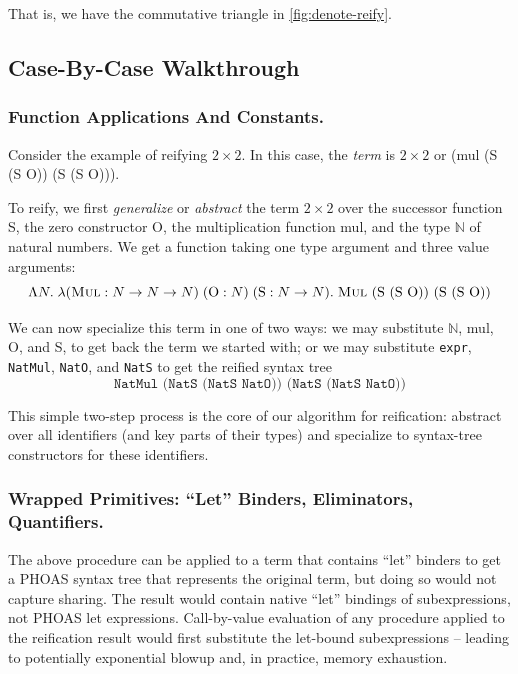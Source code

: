 That is, we have the commutative triangle in \autoref{fig:denote-reify}.

\subsection{Case-By-Case Walkthrough} \label{sec:case-by-case-walkthrough}
\subsubsection{Function Applications And Constants.} \label{sec:reification-by-parametricity-diagram}\label{sec:walkthrough-func-const}
Consider the example of reifying $2\times 2$.
In this case, the \emph{term} is $2 \times 2$ or (mul (S (S O)) (S (S O))).

To reify, we first \emph{generalize} or \emph{abstract} the term $2\times 2$ over the successor function S, the zero constructor O, the multiplication function mul, and the type $\mathbb N$ of natural numbers.
We get a function taking one type argument and three value arguments:
$$\Lambda N. \; \lambda (\textsc{Mul} : N \to N \to N) \; (\text{O} : N) \; (\text{S} : N \to N). \; \text{\textsc{Mul} (S (S O)) (S (S O))}$$

We can now specialize this term in one of two ways: we may substitute $\mathbb N$, mul, O, and S, to get back the term we started with; or we may substitute \texttt{expr}, \texttt{NatMul}, \texttt{NatO}, and \texttt{NatS} to get the reified syntax tree
\[
\texttt{NatMul (NatS (NatS NatO)) (NatS (NatS NatO))}
\]

This simple two-step process is the core of our algorithm for reification:
abstract over all identifiers (and key parts of their types) and specialize to syntax-tree constructors for these identifiers.

\subsubsection{Wrapped Primitives: ``Let'' Binders, Eliminators, Quantifiers.}\label{sec:walkthrough-wrapped}

The above procedure can be applied to a term that contains ``let'' binders to get a
PHOAS syntax tree that represents the original term, but doing so would not capture
sharing. The result would contain native ``let'' bindings of subexpressions, not
PHOAS let expressions. Call-by-value evaluation of any procedure applied to the
reification result would first substitute the let-bound subexpressions --
leading to potentially exponential blowup and, in practice, memory exhaustion.

